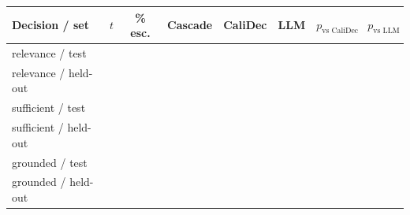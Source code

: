 \begin{tabular}{lccccccc}
\toprule
\textbf{Decision / set} & $t$ & \textbf{\% esc.} & \textbf{Cascade} & \textbf{CaliDec} & \textbf{LLM} & $p_{\text{vs CaliDec}}$ & $p_{\text{vs LLM}}$ \\
\midrule
relevance / test & \ph{--} & \ph{--} & \ph{--} & \ph{--} & \ph{--} & \ph{--} & \ph{--} \\
relevance / held-out & \ph{--} & \ph{--} & \ph{--} & \ph{--} & \ph{--} & \ph{--} & \ph{--} \\
sufficient / test & \ph{--} & \ph{--} & \ph{--} & \ph{--} & \ph{--} & \ph{--} & \ph{--} \\
sufficient / held-out & \ph{--} & \ph{--} & \ph{--} & \ph{--} & \ph{--} & \ph{--} & \ph{--} \\
grounded / test & \ph{--} & \ph{--} & \ph{--} & \ph{--} & \ph{--} & \ph{--} & \ph{--} \\
grounded / held-out & \ph{--} & \ph{--} & \ph{--} & \ph{--} & \ph{--} & \ph{--} & \ph{--} \\
\bottomrule
\end{tabular}
